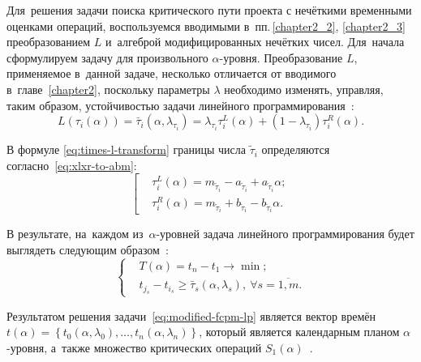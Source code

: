 Для~решения задачи поиска критического пути проекта с нечёткими временными оценками операций, воспользуемся вводимыми в~пп.\,\ref{chapter2_2}, \ref{chapter2_3} преобразованием $L$ и~алгеброй модифицированных нечётких чисел. Для~начала сформулируем задачу для произвольного $\alpha$-уровня. Преобразование $L$, применяемое в~данной задаче, несколько отличается от вводимого в~главе~\ref{chapter2}, поскольку параметры $\lambda$ необходимо изменять, управляя, таким образом, устойчивостью задачи линейного программирования~\cite{Vorontsov_VSTU}:
\begin{equation}
\label{eq:times-l-transform}
  L(\tau_i(\alpha ))=\bar{\tau}_i\left(\alpha, \lambda_{\tau_i}\right)=\lambda_{\tau_i}\tau_{i}^{L}\left(\alpha \right)+(1-\lambda_{\tau_i})\tau_{i}^{R}\left(\alpha \right).
\end{equation}

В формуле \eqref{eq:times-l-transform} границы числа $\tilde \tau_i$ определяются согласно~\eqref{eq:xlxr-to-abm}:
\begin{equation*}
  \left[ \begin{aligned}
    & \tau_{i}^{L}\left(\alpha \right)=m_{\tilde \tau_i}-a_{\tilde \tau_i}+a_{\tilde \tau_i}\alpha; \\ 
    & \tau_{i}^{R}\left(\alpha \right)={{m}_{{{{\tilde{\tau }}}_{i}}}}+{{b}_{{{{\tilde{\tau }}}_{i}}}}-{{b}_{{{{\tilde{\tau }}}_{i}}}}\alpha.
  \end{aligned} \right.
\end{equation*}

В результате, на~каждом из~$\alpha$-уровней задача линейного программирования будет выглядеть следующим образом~\cite{Alushta-2, Vorontsov_VSTU}:
\begin{equation}
\label{eq:modified-fcpm-lp}
  \left\{ \begin{aligned}
    & T(\alpha )=t_n-t_1\to \min;  \\ 
    & t_{j_s}-t_{i_s}\geqslant \bar{\tau}_s\left(\alpha,\lambda_s \right),\ \forall s=\overline{1,m}.
  \end{aligned} \right.
\end{equation}

Результатом решения задачи~\eqref{eq:modified-fcpm-lp} является вектор времён $t\left( \alpha \right)=\left\{ t_0\left(\alpha, \lambda_0\right),\ldots,t_n\left(\alpha, \lambda_n\right) \right\}$, который является календарным планом $\alpha$-уровня, а~также множество критических операций $S_1\left( \alpha \right)$~\cite{VSU-2, Alushta-2}.

